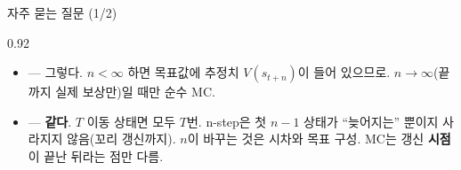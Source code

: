 \begin{frame}{자주 묻는 질문 (1/2)}
\begin{center}\begin{varwidth}{0.92\textwidth}
  \begin{itemize}
    \item {} --- 그렇다. $n < \infty$
      하면 목표값에 추정치 $V(s_{t+n})$이 들어 있으므로.
      $n\to\infty$(끝까지 실제 보상만)일 때만 순수 MC.
    \item {} --- \textbf{같다}.
      $T$ 이동 상태면 모두 $T$번. n-step은 첫 $n-1$ 상태가 ``늦어지는''
      뿐이지 사라지지 않음(꼬리 갱신까지). $n$이 바꾸는 것은 시차와
      목표 구성. MC는 갱신 \textbf{시점}이 끝난 뒤라는 점만 다름.
  \end{itemize}
\end{varwidth}\end{center}
\end{frame}
